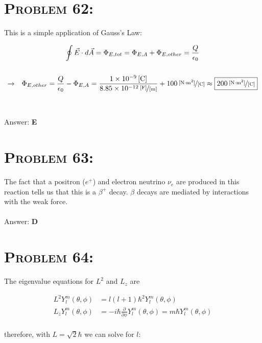 \documentclass{article}
\providecommand{\e}[1]{\ensuremath{\times 10^{#1}}}
\begin{document}

\section{\textsc{Problem 62:}} This is a simple application of Gauss's Law:

\begin{gather}
\oint \vec{E} \cdot d\vec{A} = \Phi_{E, tot} =  \Phi_{E, A}  + \Phi_{E, other} = \frac{Q}{\epsilon_{0}}\\
\nonumber\\
\rightarrow \hspace{.1in} \Phi_{E, other} = \frac{Q}{\epsilon_{0}} -  \Phi_{E, A}  = \frac{\unit[1\e{-9}]{[C]}}
{\unitfrac[8.85\e{-12}]{[F]}{[m]}} + \unitfrac[100]{[N \cdot m^{2}]}{[C]} \approx \boxed{\unitfrac[200]{[N \cdot m^{2}]}{[C]}}\nonumber
\end{gather}
\\\\
Answer: \textbf{\textcolor{ProcessBlue}E}\\


\section{\textsc{Problem 63:}} The fact that a positron ($e^{+}$) and electron neutrino ${\nu_{e}}$ are produced in this reaction tells us that this is a $\beta^{+}$ decay. $\beta$ decays are mediated by interactions with the weak force.
\\\\
Answer: \textbf{\textcolor{ProcessBlue}D}\\


\section{\textsc{Problem 64:}} The eigenvalue equations for $L^{2}$ and $L_{z}$ are

\begin{align}
L^{2} Y^{m}_{l}(\theta, \phi) &= l (l + 1) \hbar^{2} Y^{m}_{l}(\theta, \phi)\\
L_{z} Y^{m}_{l}(\theta, \phi) &= -i \hbar \frac{\partial}{\partial \phi} Y^{m}_{l}(\theta, \phi) = m \hbar Y^{m}_{l}(\theta, \phi)
\end{align}
\\
therefore, with $L = \sqrt{2} \hbar$ we can solve for $l$:
\end{document}
